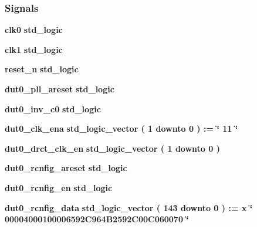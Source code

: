 \subsubsection*{Signals}
 \begin{DoxyCompactItemize}
\item 
{\bf clk0} {\bfseries \textcolor{comment}{std\+\_\+logic}\textcolor{vhdlchar}{ }} 
\item 
{\bf clk1} {\bfseries \textcolor{comment}{std\+\_\+logic}\textcolor{vhdlchar}{ }} 
\item 
{\bf reset\+\_\+n} {\bfseries \textcolor{comment}{std\+\_\+logic}\textcolor{vhdlchar}{ }} 
\item 
{\bf dut0\+\_\+pll\+\_\+areset} {\bfseries \textcolor{comment}{std\+\_\+logic}\textcolor{vhdlchar}{ }} 
\item 
{\bf dut0\+\_\+inv\+\_\+c0} {\bfseries \textcolor{comment}{std\+\_\+logic}\textcolor{vhdlchar}{ }} 
\item 
{\bf dut0\+\_\+clk\+\_\+ena} {\bfseries \textcolor{comment}{std\+\_\+logic\+\_\+vector}\textcolor{vhdlchar}{ }\textcolor{vhdlchar}{(}\textcolor{vhdlchar}{ }\textcolor{vhdlchar}{ } \textcolor{vhdldigit}{1} \textcolor{vhdlchar}{ }\textcolor{keywordflow}{downto}\textcolor{vhdlchar}{ }\textcolor{vhdlchar}{ } \textcolor{vhdldigit}{0} \textcolor{vhdlchar}{ }\textcolor{vhdlchar}{)}\textcolor{vhdlchar}{ }\textcolor{vhdlchar}{ }\textcolor{vhdlchar}{ }\textcolor{vhdlchar}{\+:}\textcolor{vhdlchar}{=}\textcolor{vhdlchar}{ }\textcolor{vhdlchar}{ }\textcolor{vhdlchar}{ }\textcolor{vhdlchar}{ }\textcolor{keyword}{\char`\"{} 11 \char`\"{}}\textcolor{vhdlchar}{ }} 
\item 
{\bf dut0\+\_\+drct\+\_\+clk\+\_\+en} {\bfseries \textcolor{comment}{std\+\_\+logic\+\_\+vector}\textcolor{vhdlchar}{ }\textcolor{vhdlchar}{(}\textcolor{vhdlchar}{ }\textcolor{vhdlchar}{ } \textcolor{vhdldigit}{1} \textcolor{vhdlchar}{ }\textcolor{keywordflow}{downto}\textcolor{vhdlchar}{ }\textcolor{vhdlchar}{ } \textcolor{vhdldigit}{0} \textcolor{vhdlchar}{ }\textcolor{vhdlchar}{)}\textcolor{vhdlchar}{ }} 
\item 
{\bf dut0\+\_\+rcnfig\+\_\+areset} {\bfseries \textcolor{comment}{std\+\_\+logic}\textcolor{vhdlchar}{ }} 
\item 
{\bf dut0\+\_\+rcnfig\+\_\+en} {\bfseries \textcolor{comment}{std\+\_\+logic}\textcolor{vhdlchar}{ }} 
\item 
{\bf dut0\+\_\+rcnfig\+\_\+data} {\bfseries \textcolor{comment}{std\+\_\+logic\+\_\+vector}\textcolor{vhdlchar}{ }\textcolor{vhdlchar}{(}\textcolor{vhdlchar}{ }\textcolor{vhdlchar}{ } \textcolor{vhdldigit}{143} \textcolor{vhdlchar}{ }\textcolor{keywordflow}{downto}\textcolor{vhdlchar}{ }\textcolor{vhdlchar}{ } \textcolor{vhdldigit}{0} \textcolor{vhdlchar}{ }\textcolor{vhdlchar}{)}\textcolor{vhdlchar}{ }\textcolor{vhdlchar}{ }\textcolor{vhdlchar}{ }\textcolor{vhdlchar}{\+:}\textcolor{vhdlchar}{=}\textcolor{vhdlchar}{ }\textcolor{vhdlchar}{ }\textcolor{vhdlchar}{x}\textcolor{vhdlchar}{ }\textcolor{keyword}{\char`\"{} 00004000100006592\+C964\+B2592\+C00\+C060070 \char`\"{}}\textcolor{vhdlchar}{ }} 

\end{DoxyCompactItemize}
